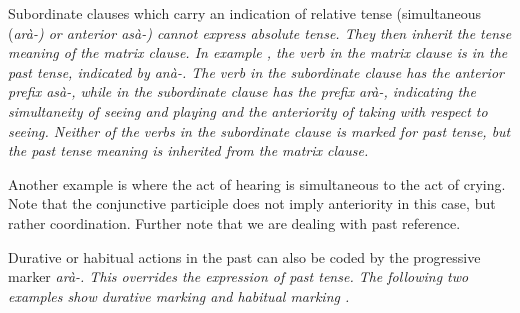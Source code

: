 Subordinate clauses which carry an indication of relative tense (simultaneous (\em arà-\em) or anterior \em asà-\em) cannot express absolute tense. They then inherit the tense meaning of the matrix clause. In example , the verb  in the matrix clause is in the past tense, indicated by \em anà-\em. The verb  in the subordinate clause has the anterior prefix \em asà-\em, while  in the subordinate clause has the prefix \em arà-\em, indicating the simultaneity of seeing and playing and the anteriority of taking with respect to seeing. Neither of the verbs in the subordinate clause is marked for past tense, but the past tense meaning is inherited from the matrix clause.



Another example is  where the act of hearing is simultaneous to the act of crying. Note that the conjunctive participle does not imply anteriority in this case, but rather coordination. Further note that we are dealing with past reference.



Durative or habitual actions in the past can also be coded by the progressive marker \em arà-\em. This overrides the expression of past tense. The following two examples show durative marking  and habitual marking .


